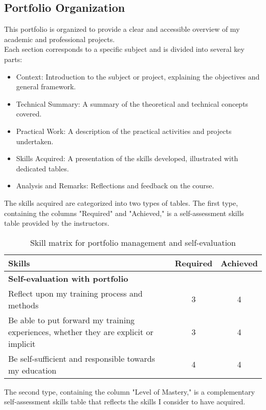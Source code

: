 \subsection*{Portfolio Organization}
\indent \indent This portfolio is organized to provide a clear and accessible overview of my academic and professional projects.\\
Each section corresponds to a specific subject and is divided into several key parts:
\begin{itemize}
    \item Context: Introduction to the subject or project, explaining the objectives and general framework.
    \item Technical Summary: A summary of the theoretical and technical concepts covered.
    \item Practical Work: A description of the practical activities and projects undertaken.
    \item Skills Acquired: A presentation of the skills developed, illustrated with dedicated tables.
    \item Analysis and Remarks: Reflections and feedback on the course.
\end{itemize}
The skills acquired are categorized into two types of tables. The first type, containing the columns "Required" and "Achieved," is a self-assessment skills table provided by the instructors.

\begin{table}[H]
    \centering
    \renewcommand{\arraystretch}{1.5} %
    \begin{tabular}{|p{11cm}|c|c|}
    \hline
    \rowcolor[gray]{0.8}
    \textbf{Skills} & \textbf{Required} & \textbf{Achieved} \\ \hline
    \rowcolor[gray]{0.9} \textbf{Self-evaluation with portfolio} &  &  \\ \hline
    Reflect upon my training process and methods & 3 & 4 \\ \hline
    Be able to put forward my training experiences, whether they are explicit or implicit & 3 & 4 \\ \hline
    Be self-sufficient and responsible towards my education & 4 & 4 \\ \hline
    \end{tabular}
    \caption{Skill matrix for portfolio management and self-evaluation}
    \label{table:skills}
\end{table}

\noindent The second type, containing the column "Level of Mastery," is a complementary self-assessment skills table that reflects the skills I consider to have acquired.